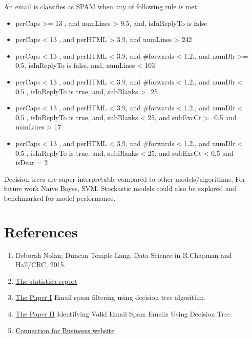 \documentclass[
]{article}
\providecommand{\tightlist}{%
  \setlength{\itemsep}{0pt}\setlength{\parskip}{0pt}}
\begin{document}
An email is classifies as SPAM when any of following rule is met:

\begin{itemize}
\tightlist
\item
  perCaps \textgreater= 13 , and numLines \textgreater{} 9.5, and,
  isInReplyTo is false
\item
  perCaps \textless{} 13 , and perHTML \textgreater{} 3.9, and numLines
  \textgreater{} 242
\item
  perCaps \textless{} 13 , and perHTML \textless{} 3.9, and \#forwards
  \textless{} 1.2., and numDlr \textgreater= 0.5, isInReplyTo is false,
  and, numLines \textless{} 103
\item
  perCaps \textless{} 13 , and perHTML \textless{} 3.9, and \#forwards
  \textless{} 1.2., and numDlr \textless{} 0.5 , isInReplyTo is true,
  and, subBlanks \textgreater=25
\item
  perCaps \textless{} 13 , and perHTML \textless{} 3.9, and \#forwards
  \textless{} 1.2., and numDlr \textless{} 0.5 , isInReplyTo is true,
  and, subBlanks \textless{} 25, and subExcCt \textgreater=0.5 and
  numLines \textgreater{} 17
\item
  perCaps \textless{} 13 , and perHTML \textless{} 3.9, and \#forwards
  \textless{} 1.2., and numDlr \textless{} 0.5 , isInReplyTo is true,
  and, subBlanks \textless{} 25, and subExcCt \textless{} 0.5 and isDear
  = 2
\end{itemize}

Decision trees are super interpretable compared to other
models/algorithms, For future work Naive Bayes, SVM, Stockastic models
could also be explored and benchmarked for model performance.

\newpage

\hypertarget{references}{%
\section*{References}\label{references}}

\begin{enumerate}
\def\labelenumi{\arabic{enumi}.}
\tightlist
\item
  Deborah Nolan; Duncan Temple Lang. Data Science in R.Chapman and
  Hall/CRC, 2015.
\item
  \href{https://www.statista.com/statistics/420391/spam-email-traffic-share/}{The
  statistica report}
\item
  \href{https://www.ijser.org/researchpaper/EMAIL-SPAM-FILTERING-USING-DECISION-TREE-ALGORITHM.pdf}{The
  Paper I} Email spam filtering using decision tree algorithm.
\item
  \href{https://ijcat.com/archives/volume5/issue2/ijcatr05021004.pdf}{The
  Paper II} Identifying Valid Email Spam Emails Using Decision Tree.
\item
  \href{https://www.connections.com/blog/the-negative-effects-of-spam}{Connection
  for Businesss website}
\end{enumerate}
\end{document}
